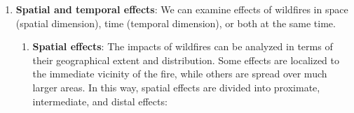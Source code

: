\documentclass[
  12 pt,
]{Nemilov}
\providecommand{\tightlist}{%
  \setlength{\itemsep}{0pt}\setlength{\parskip}{0pt}}
\begin{document}
\begin{enumerate}
\def\labelenumi{\arabic{enumi}.}
\tightlist
\item
  \textbf{Spatial and temporal effects}: We can examine effects of wildfires in space (spatial dimension), time (temporal dimension), or both at the same time.

  \begin{enumerate}
  \def\labelenumii{\alph{enumii}.}
  \tightlist
  \item
    \textbf{Spatial effects}: The impacts of wildfires can be analyzed in terms of their geographical extent and distribution. Some effects are localized to the immediate vicinity of the fire, while others are spread over much larger areas. In this way, spatial effects are divided into proximate, intermediate, and distal effects:


\end{enumerate}
\end{enumerate}
\end{document}
